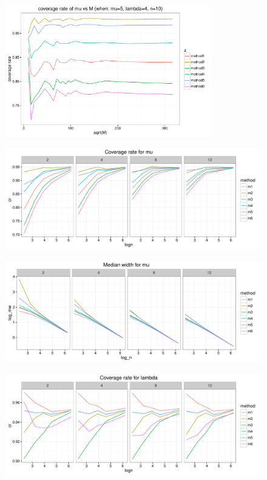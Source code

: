 \documentclass[12pt]{article}
\begin{document}
\begin{figure}[h] 
\includegraphics[width=0.8\textwidth]{findM3.pdf}
\caption{}
\end{figure}

\begin{figure}[h] 
\includegraphics[width=1.1\textwidth]{results1.pdf}
\caption{}
\end{figure}

\begin{figure}[h] 
\includegraphics[width=1.1\textwidth]{results2.pdf}
\caption{}
\end{figure}

\begin{figure}[h] 
\includegraphics[width=1.1\textwidth]{results3.pdf}
\caption{}
\end{figure}
\end{document}
